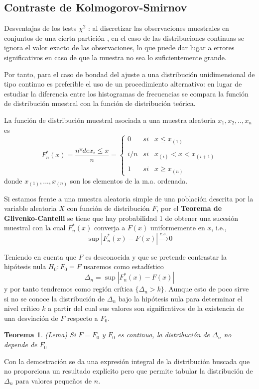 \documentclass[a4paper,12pt]{article}
\newtheorem{theorem}{Teorema}
\begin{document}
\subsection{Contraste de Kolmogorov-Smirnov }
Desventajas de los tests $\chi^2$ : al discretizar las observaciones muestrales en conjuntos de una cierta partición , en el caso de las distribuciones continuas se ignora el valor exacto de las observaciones, lo que puede dar lugar a errores significativos en caso de que la muestra no sea lo suficientemente grande.

Por tanto, para el caso de bondad del ajuste a una distribución unidimensional de tipo continuo es preferible el uso de un procedimiento alternativo: en lugar de estudiar la diferencia entre los histogramas de frecuencias se compara la función de distribución muestral con la función de distribución teórica.

La función de distribución muestral asociada a  una muestra aleatoria $x_1, x_2,..,x_n$ es 
$$F^*_n(x) = \frac{nº de x_i \leq x}{n} = \left\{ \begin{array}{lcc}
             0 &   si  & x \leq x_{(1)} \\
             \\ i/n &  si & x_{(i)} < x < x_{(i+1)} \\
             \\ 1 &  si  & x \geq x_{(n)}
             \end{array}
   \right. $$
donde $x_{(1)},...,x_{(n)}$ son los elementos de la m.a. ordenada.

Si estamos frente a una muestra aleatoria simple de una población descrita por la variable aleatoria $X$ con función de distribución $F$, por el \textbf{Teorema de Glivenko-Cantelli} se tiene que hay probabilidad 1 de obtener una sucesión muestral con la cual $F^*_n(x)$ converja a $F(x)$ uniformemente en $x$, i.e.,
$$\sup |F^*_n(x) - F(x)| \xrightarrow{c.s.} 0$$

Teniendo en cuenta que $F$ es desconocida y que se pretende contrastar la hipótesis nula $H_0 : F_0 = F$ usaremos como estadístico
$$\Delta_n = \sup |F^*_n(x) - F(x)|  $$
y por tanto tendremos como región crítica $\{\Delta_n > k\}$. Aunque esto de poco sirve si no se conoce la distribución de $\Delta_n$ bajo la hipótesis nula para determinar el nivel crítico $k$ a partir del cual sus valores son significativos de la existencia de una desviación de $F$ respecto a $F_0$.

\begin{theorem}
(Lema) Si $F = F_0$ y $F_0$ es continua, la distribución de $\Delta_n$ no depende de $F_0$
\end{theorem}
Con la demostración se da una expresión integral de la distribución buscada que no proporciona un resultado explícito pero que permite tabular la distribución de $\Delta_n$ para valores pequeños de $n$.
\end{document}
